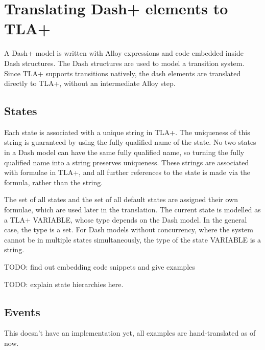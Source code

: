 \chapter{Translating Dash+ elements to TLA+}

A Dash+ model is written with Alloy expressions and code embedded inside Dash structures. The Dash structures are used to model a transition system. Since TLA+ supports transitions natively, the dash elements are translated directly to TLA+, without an intermediate Alloy step.




\section{States}

Each state is associated with a unique string in TLA+. The uniqueness of this string is guaranteed by using the fully qualified name of the state. No two states in a Dash model can have the same fully qualified name, so turning the fully qualified name into a string preserves uniqueness. These strings are associated with formulae in TLA+, and all further references to the state is made via the formula, rather than the string.

The set of all states and the set of all default states are assigned their own formulae, which are used later in the translation. The current state is modelled as a TLA+ VARIABLE, whose type depends on the Dash model. In the general case, the type is a set. For Dash models without concurrency, where the system cannot be in multiple states simultaneously, the type of the state VARIABLE is a string.

TODO: find out embedding code snippets and give examples

TODO: explain state hierarchies here.

\section{Events}

This doesn't have an implementation yet, all examples are hand-translated as of now.

